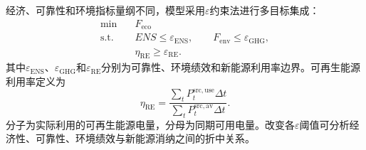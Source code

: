 经济、可靠性和环境指标量纲不同，模型采用$\varepsilon$约束法进行多目标集成：
\begin{equation}
\begin{aligned}
\min\quad &F_{\mathrm{eco}}\\
\mathrm{s.t.}\quad
&ENS\le\varepsilon_{\mathrm{ENS}},\qquad
F_{\mathrm{env}}\le\varepsilon_{\mathrm{GHG}},\\
&\eta_{\mathrm{RE}}\ge\varepsilon_{\mathrm{RE}}.
\end{aligned}
\label{eq:epsilon-constraint}
\end{equation}
其中$\varepsilon_{\mathrm{ENS}}$、$\varepsilon_{\mathrm{GHG}}$和$\varepsilon_{\mathrm{RE}}$分别为可靠性、环境绩效和新能源利用率边界。可再生能源利用率定义为
\begin{equation}
\eta_{\mathrm{RE}}
=\frac{\sum_tP_t^{\mathrm{src,use}}\Delta t}
{\sum_tP_t^{\mathrm{src,av}}\Delta t}.
\label{eq:renewable-utilization}
\end{equation}
分子为实际利用的可再生能源电量，分母为同期可用电量。改变各$\varepsilon$阈值可分析经济性、可靠性、环境绩效与新能源消纳之间的折中关系。

